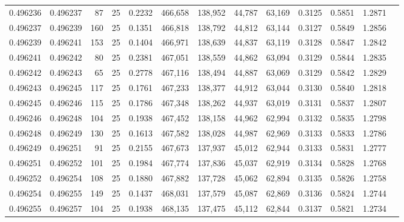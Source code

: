 \begin{tabular}{rrrrrrrrrrrrr}
0.496236 & 0.496237 &    87 &  25 &                                     0.2232 & 466,658 & 138,952 &  44,787 &  63,169 & 0.3125 & 0.5851 & 1.2871 \\
0.496237 & 0.496239 &   160 &  25 &                                     0.1351 & 466,818 & 138,792 &  44,812 &  63,144 & 0.3127 & 0.5849 & 1.2856 \\
0.496239 & 0.496241 &   153 &  25 &                                     0.1404 & 466,971 & 138,639 &  44,837 &  63,119 & 0.3128 & 0.5847 & 1.2842 \\
0.496241 & 0.496242 &    80 &  25 &                                     0.2381 & 467,051 & 138,559 &  44,862 &  63,094 & 0.3129 & 0.5844 & 1.2835 \\
0.496242 & 0.496243 &    65 &  25 &                                     0.2778 & 467,116 & 138,494 &  44,887 &  63,069 & 0.3129 & 0.5842 & 1.2829 \\
0.496243 & 0.496245 &   117 &  25 &                                     0.1761 & 467,233 & 138,377 &  44,912 &  63,044 & 0.3130 & 0.5840 & 1.2818 \\
0.496245 & 0.496246 &   115 &  25 &                                     0.1786 & 467,348 & 138,262 &  44,937 &  63,019 & 0.3131 & 0.5837 & 1.2807 \\
0.496246 & 0.496248 &   104 &  25 &                                     0.1938 & 467,452 & 138,158 &  44,962 &  62,994 & 0.3132 & 0.5835 & 1.2798 \\
0.496248 & 0.496249 &   130 &  25 &                                     0.1613 & 467,582 & 138,028 &  44,987 &  62,969 & 0.3133 & 0.5833 & 1.2786 \\
0.496249 & 0.496251 &    91 &  25 &                                     0.2155 & 467,673 & 137,937 &  45,012 &  62,944 & 0.3133 & 0.5831 & 1.2777 \\
0.496251 & 0.496252 &   101 &  25 &                                     0.1984 & 467,774 & 137,836 &  45,037 &  62,919 & 0.3134 & 0.5828 & 1.2768 \\
0.496252 & 0.496254 &   108 &  25 &                                     0.1880 & 467,882 & 137,728 &  45,062 &  62,894 & 0.3135 & 0.5826 & 1.2758 \\
0.496254 & 0.496255 &   149 &  25 &                                     0.1437 & 468,031 & 137,579 &  45,087 &  62,869 & 0.3136 & 0.5824 & 1.2744 \\
0.496255 & 0.496257 &   104 &  25 &                                     0.1938 & 468,135 & 137,475 &  45,112 &  62,844 & 0.3137 & 0.5821 & 1.2734 \\

\end{tabular}
